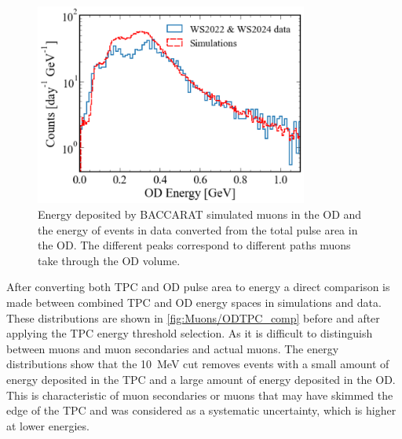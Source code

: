 \begin{figure}[ht!]
    \centering
    \includegraphics[width=0.8\textwidth]{figures/Muons/OD_comparison.pdf}
    \caption{Energy deposited by BACCARAT simulated muons in the OD and the energy of events in data converted from the total pulse area in the OD. The different peaks correspond to different paths muons take through the OD volume.}
    \label{fig:Muons/OD_comp}
\end{figure}
After converting both TPC and OD pulse area to energy a direct comparison is made between combined TPC and OD energy spaces in simulations and data. These distributions are shown in \autoref{fig:Muons/ODTPC_comp} before and after applying the TPC energy threshold selection.
As it is difficult to distinguish between muons and muon secondaries and actual muons. The energy distributions show that the 10~MeV cut removes events with a small amount of energy deposited in the TPC and a large amount of energy deposited in the OD. This is characteristic of muon secondaries or muons that may have skimmed the edge of the TPC and was considered as a systematic uncertainty, which is higher at lower energies.
